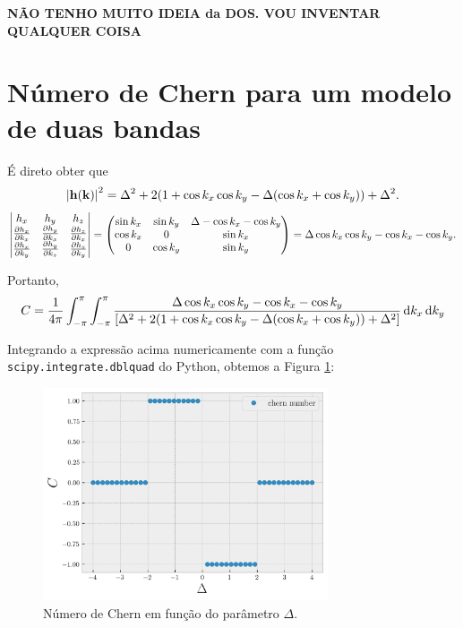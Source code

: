\documentclass[a4paper,10pt]{article}
\begin{document}
\textbf{NÃO TENHO MUITO IDEIA da DOS. VOU INVENTAR QUALQUER COISA}

\pagebreak

\section{Número de Chern para um modelo de duas bandas}

É direto obter que
$$
\abs{\vb{h}(\vb{k})}^2 =
\Delta^2 + 2 (1 + \cos k_x \cos k_y - \Delta (\cos k_x + \cos k_y)) + \Delta^2.
$$
$$
\begin{vmatrix}
h_x & h_y & h_z \\
\pdv{h_x}{k_x} & \pdv{h_y}{k_x} & \pdv{h_z}{k_x} \\
\pdv{h_x}{k_y} & \pdv{h_y}{k_z} & \pdv{h_z}{k_y} \\
\end{vmatrix}
=
\begin{pmatrix}
\sin k_x & \sin k_y & \Delta - \cos k_x - \cos k_y \\
\cos k_x &  0 & \sin k_x \\
0 & \cos k_y & \sin k_y \\
\end{pmatrix}
=
\Delta \cos k_x \cos k_y - \cos k_x - \cos k_y.
$$

Portanto,
$$
C = \frac{1}{4\pi} \int_{-\pi}^{\pi} \int_{-\pi}^{\pi}
\frac{\Delta \cos k_x \cos k_y - \cos k_x - \cos k_y}{\qty[\Delta^2 + 2 (1 + \cos k_x \cos k_y - \Delta (\cos k_x + \cos k_y)) + \Delta^2]}
\dd{k_x} \dd{k_y}
$$

Integrando a expressão acima numericamente com a função \texttt{scipy.integrate.dblquad} do Python, obtemos a Figura \ref{fig:chern}:
\begin{figure}[H]
\centering
\includegraphics[width=0.75\textwidth]{fig/chern.png}
\caption{Número de Chern em função do parâmetro $\Delta$.}
\label{fig:chern}
\end{figure}
\end{document}
